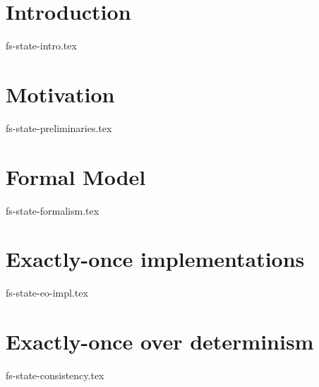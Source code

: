 \documentclass[conference]{IEEEtran}
\theoremstyle{definition}
\newcommand {\eo} {exactly-once}
\begin{document}
\begin{abstract}
Consistency requirements for state-of-the-art stream processing systems are defined in terms of delivery guarantees. 
Exactly-once is the strongest one and the most desirable for end-user. 
However, there are several issues regarding this concept. 
 Commonly used techniques that enforce \eo\ produce significant performance overhead. 
Besides, the notion of \eo\ is not formally defined and does not capture all properties that provide stream processing systems supporting this guarantee. 
In this paper, we introduce a formal framework that allows us to define streaming guarantees more regularly. 
We demonstrate that the properties of delivery, consistency, and determinism are tightly connected within distributed stream processing. 
We also show that having lightweight determinism, it is possible to provide \eo\ with almost no performance overhead. Experiments show that the proposed approach can significantly outperform alternative industrial solutions.
\end{abstract}

\section {Introduction}
 {fs-state-intro.tex}

\section {Motivation}
 {fs-state-preliminaries.tex}

\section {Formal Model}
 {fs-state-formalism.tex}

\section {Exactly-once implementations}
 {fs-state-eo-impl.tex}



\section{Exactly-once over determinism}
  {fs-state-consistency.tex}
\end{document}
